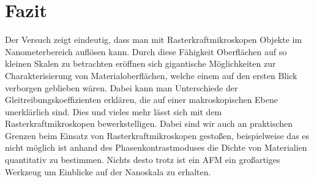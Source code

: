 

\chapter{Fazit}
\label{chap:fazit}


Der Versuch zeigt eindeutig, dass man mit Rasterkraftmikroskopen Objekte im Nanometerbereich auflösen kann. Durch diese Fähigkeit Oberflächen auf so kleinen Skalen zu betrachten eröffnen sich 
gigantische Möglichkeiten zur Charakterisierung von Materialoberflächen, welche einem auf den ersten Blick verborgen geblieben wären. Dabei kann man Unterschiede der Gleitreibungskoeffizienten erklären, 
die auf einer makroskopischen Ebene unerklärlich sind. Dies und vieles mehr lässt sich mit dem Rasterkraftmikroskopen bewerkstelligen. Dabei sind wir auch an praktischen Grenzen beim 
Einsatz von Rasterkraftmikroskopen gestoßen, beispielweise das es nicht möglich ist anhand des Phasenkontrastmoduses die Dichte von Materialien quantitativ zu bestimmen. Nichts 
desto trotz ist ein AFM ein großartiges Werkzeug um Einblicke auf der Nanoskala zu erhalten. 
